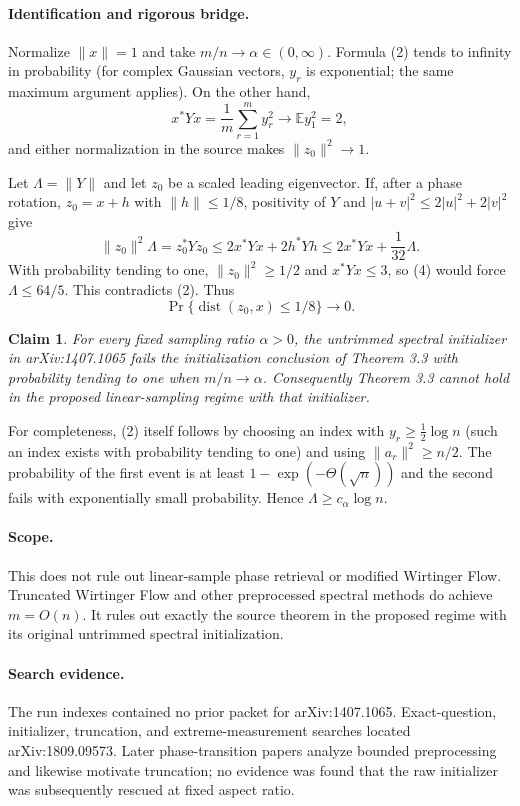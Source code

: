 \documentclass[11pt]{article}
\newtheorem*{claim}{Claim}
\begin{document}
\paragraph{Identification and rigorous bridge.}
Normalize $\|x\|=1$ and take $m/n\to\alpha\in(0,\infty)$.  Formula (2) tends
to infinity in probability (for complex Gaussian vectors, $y_r$ is
exponential; the same maximum argument applies).  On the other hand,
\[
 x^*Yx=\frac1m\sum_{r=1}^m y_r^2\longrightarrow \mathbb E y_1^2=2,    \tag{3}
\]
and either normalization in the source makes $\|z_0\|^2\to1$.

Let $\Lambda=\|Y\|$ and let $z_0$ be a scaled leading eigenvector.  If, after
a phase rotation, $z_0=x+h$ with $\|h\|\leq1/8$, positivity of $Y$ and
$|u+v|^2\leq2|u|^2+2|v|^2$ give
\[
 \|z_0\|^2\Lambda=z_0^*Yz_0
 \leq2x^*Yx+2h^*Yh
 \leq2x^*Yx+\frac1{32}\Lambda.                                    \tag{4}
\]
With probability tending to one, $\|z_0\|^2\geq1/2$ and $x^*Yx\leq3$,
so (4) would force $\Lambda\leq 64/5$.  This contradicts (2).  Thus
\[
 \Pr\{\operatorname{dist}(z_0,x)\leq1/8\}\longrightarrow0.          \tag{5}
\]

\begin{claim}
For every fixed sampling ratio $\alpha>0$, the untrimmed spectral initializer
in arXiv:1407.1065 fails the initialization conclusion of Theorem 3.3 with
probability tending to one when $m/n\to\alpha$.  Consequently Theorem 3.3
cannot hold in the proposed linear-sampling regime with that initializer.
\end{claim}

For completeness, (2) itself follows by choosing an index with
$y_r\geq\tfrac12\log n$ (such an index exists with probability tending to
one) and using $\|a_r\|^2\geq n/2$.  The probability of the first event is at
least $1-\exp(-\Theta(\sqrt n))$ and the second fails with exponentially small
probability.  Hence $\Lambda\geq c_\alpha\log n$.

\paragraph{Scope.}
This does not rule out linear-sample phase retrieval or modified Wirtinger
Flow.  Truncated Wirtinger Flow and other preprocessed spectral methods do
achieve $m=O(n)$.  It rules out exactly the source theorem in the proposed
regime with its original untrimmed spectral initialization.

\paragraph{Search evidence.}
The run indexes contained no prior packet for arXiv:1407.1065.  Exact-question,
initializer, truncation, and extreme-measurement searches located
arXiv:1809.09573.  Later phase-transition papers analyze bounded preprocessing
and likewise motivate truncation; no evidence was found that the raw
initializer was subsequently rescued at fixed aspect ratio.
\end{document}
